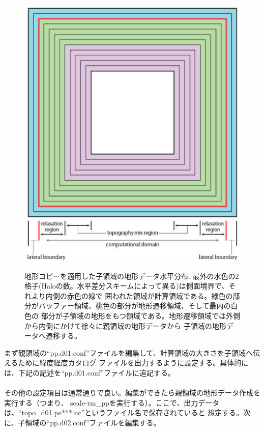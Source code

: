 \begin{figure}[tb]
\begin{center}
  \includegraphics[width=0.4\hsize]{./figure/topo_copy.eps}\\
  \caption{地形コピーを適用した子領域の地形データ水平分布. 最外の水色の2格子(Haloの数。水平差分スキームによって異る)は側面境界で、それより内側の赤色の線で
           囲われた領域が計算領域である。緑色の部分がバッファー領域、桃色の部分が地形遷移領域、そして最内の白色の
           部分が子領域の地形をもつ領域である。地形遷移領域では外側から内側にかけて徐々に親領域の地形データから
           子領域の地形データへ遷移する。}
  \label{fig_topocopy}
\end{center}
\end{figure}

まず親領域の``pp.d01.conf''ファイルを編集して、計算領域の大きさを子領域へ伝えるために緯度経度カタログ
ファイルを出力するように設定する。具体的には、下記の記述を``pp.d01.conf''ファイルに追記する。\\

\\

\noindent その他の設定項目は通常通りで良い。編集ができたら親領域の地形データ作成を実行する（つまり、
scale-rm\_ppを実行する）。ここで、出力データは、``topo\_d01.pe***.nc''というファイル名で保存されていると
想定する。次に、子領域の``pp.d02.conf''ファイルを編集する。\\

